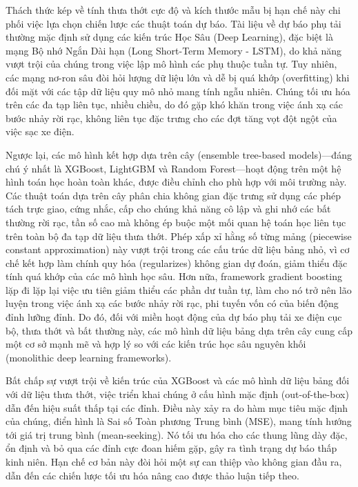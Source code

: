 \documentclass[pdflatex,sn-mathphys-num]{sn-jnl}%
\theoremstyle{thmstyleone}%
\theoremstyle{thmstyletwo}%
\theoremstyle{thmstylethree}%
\begin{document}
Thách thức kép về tính thưa thớt cực độ và kích thước mẫu bị hạn chế này chi phối việc lựa chọn chiến lược các thuật toán dự báo. Tài liệu về dự báo phụ tải thường mặc định sử dụng các kiến trúc Học Sâu (Deep Learning), đặc biệt là mạng Bộ nhớ Ngắn Dài hạn (Long Short-Term Memory - LSTM), do khả năng vượt trội của chúng trong việc lập mô hình các phụ thuộc tuần tự. Tuy nhiên, các mạng nơ-ron sâu đòi hỏi lượng dữ liệu lớn và dễ bị quá khớp (overfitting) khi đối mặt với các tập dữ liệu quy mô nhỏ mang tính ngẫu nhiên. Chúng tối ưu hóa trên các đa tạp liên tục, nhiều chiều, do đó gặp khó khăn trong việc ánh xạ các bước nhảy rời rạc, không liên tục đặc trưng cho các đợt tăng vọt đột ngột của việc sạc xe điện.

Ngược lại, các mô hình kết hợp dựa trên cây (ensemble tree-based models)---đáng chú ý nhất là XGBoost, LightGBM và Random Forest---hoạt động trên một hệ hình toán học hoàn toàn khác, được điều chỉnh cho phù hợp với môi trường này. Các thuật toán dựa trên cây phân chia không gian đặc trưng sử dụng các phép tách trực giao, cứng nhắc, cấp cho chúng khả năng cô lập và ghi nhớ các bất thường rời rạc, tần số cao mà không ép buộc một mối quan hệ toán học liên tục trên toàn bộ đa tạp dữ liệu thưa thớt. Phép xấp xỉ hằng số từng mảng (piecewise constant approximation) này vượt trội trong các cấu trúc dữ liệu bảng nhỏ, vì cơ chế kết hợp làm chính quy hóa (regularizes) không gian dự đoán, giảm thiểu đặc tính quá khớp của các mô hình học sâu. Hơn nữa, framework gradient boosting lặp đi lặp lại việc ưu tiên giảm thiểu các phần dư tuần tự, làm cho nó trở nên lão luyện trong việc ánh xạ các bước nhảy rời rạc, phi tuyến vốn có của biến động đỉnh lưỡng đỉnh. Do đó, đối với miền hoạt động của dự báo phụ tải xe điện cục bộ, thưa thớt và bất thường này, các mô hình dữ liệu bảng dựa trên cây cung cấp một cơ sở mạnh mẽ và hợp lý so với các kiến trúc học sâu nguyên khối (monolithic deep learning frameworks).

Bất chấp sự vượt trội về kiến trúc của XGBoost và các mô hình dữ liệu bảng đối với dữ liệu thưa thớt, việc triển khai chúng ở cấu hình mặc định (out-of-the-box) dẫn đến hiệu suất thấp tại các đỉnh. Điều này xảy ra do hàm mục tiêu mặc định của chúng, điển hình là Sai số Toàn phương Trung bình (MSE), mang tính hướng tới giá trị trung bình (mean-seeking). Nó tối ưu hóa cho các thung lũng dày đặc, ổn định và bỏ qua các đỉnh cực đoan hiếm gặp, gây ra tình trạng dự báo thấp kinh niên. Hạn chế cơ bản này đòi hỏi một sự can thiệp vào không gian đầu ra, dẫn đến các chiến lược tối ưu hóa nâng cao được thảo luận tiếp theo.
\end{document}
